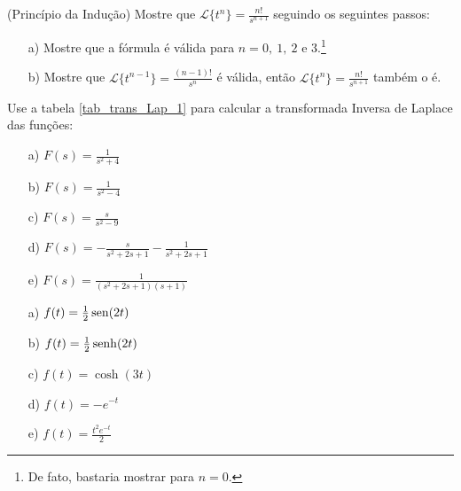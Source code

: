  \begin{Exercise}\label{inducao_tn}(Princípio da Indução) Mostre que $\displaystyle\mathcal{L}\{t^n\}=\frac{n!}{s^{n+1}}$ seguindo os seguintes passos:
 \begin{itemize}
  \item[a)] Mostre que a fórmula é válida para $n=0,\ 1,\ 2$ e $3$.\footnote{De fato, bastaria mostrar para $n=0$.}
  \item[b)] Mostre que $\displaystyle\mathcal{L}\{t^{n-1}\}=\frac{(n-1)!}{s^{n}}$ é válida, então $\displaystyle\mathcal{L}\{t^n\}=\frac{n!}{s^{n+1}}$ também o é.
 \end{itemize}

  
 \end{Exercise}

 
 \begin{Exercise}Use a tabela \ref{tab_trans_Lap_1} para calcular a transformada Inversa de Laplace das funções:
 \begin{itemize}
  \item[a)] $F(s)=\frac{1}{s^2+4}$
  \item[b)] $F(s)=\frac{1}{s^2-4}$
  \item[c)] $F(s)=\frac{s}{s^2-9}$
  \item[d)] $F(s)=-\frac{s}{s^2+2s+1}-\frac{1}{s^2+2s+1}$ 
  \item[e)] $F(s)=\frac{1}{(s^2+2s+1)(s+1)}$ 
 \end{itemize}
 
\end{Exercise}
\begin{Answer}
 \begin{itemize}
  \item[a)] $f(t)=\frac{1}{2}\operatorname{sen}(2t)$
  \item[b)] $f(t)=\frac{1}{2}\operatorname{senh}(2t)$ 
  \item[c)] $f(t)=\cosh(3t)$
  \item[d)] $f(t)=-e^{-t}$ 
  \item[e)] $f(t)=\frac{t^2e^{-t}}{2}$ 
  \end{itemize}

\end{Answer}
%